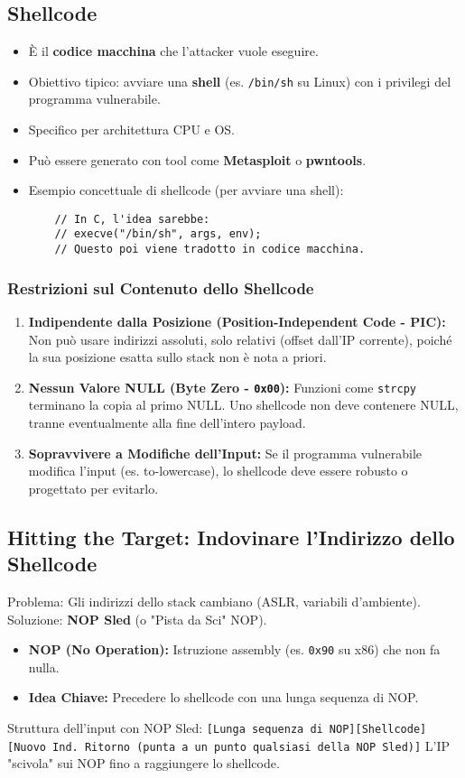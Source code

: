 \documentclass{article}
\begin{document}
\subsection{Shellcode}
\begin{itemize}
    \item È il \textbf{codice macchina} che l'attacker vuole eseguire.
    \item Obiettivo tipico: avviare una \textbf{shell} (es. \texttt{/bin/sh} su Linux) con i privilegi del programma vulnerabile.
    \item Specifico per architettura CPU e OS.
    \item Può essere generato con tool come \textbf{Metasploit} o \textbf{pwntools}.
    \item Esempio concettuale di shellcode (per avviare una shell):
    \begin{verbatim}
    // In C, l'idea sarebbe:
    // execve("/bin/sh", args, env);
    // Questo poi viene tradotto in codice macchina.
    \end{verbatim}
\end{itemize}

\subsubsection{Restrizioni sul Contenuto dello Shellcode}
\begin{enumerate}
    \item \textbf{Indipendente dalla Posizione (Position-Independent Code - PIC):}
    Non può usare indirizzi assoluti, solo relativi (offset dall'IP corrente), poiché la sua posizione esatta sullo stack non è nota a priori.
    \item \textbf{Nessun Valore NULL (Byte Zero - \texttt{0x00}):}
    Funzioni come \texttt{strcpy} terminano la copia al primo NULL. Uno shellcode non deve contenere NULL, tranne eventualmente alla fine dell'intero payload.
    \item \textbf{Sopravvivere a Modifiche dell'Input:}
    Se il programma vulnerabile modifica l'input (es. to-lowercase), lo shellcode deve essere robusto o progettato per evitarlo.
\end{enumerate}

\subsection{Hitting the Target: Indovinare l'Indirizzo dello Shellcode}
Problema: Gli indirizzi dello stack cambiano (ASLR, variabili d'ambiente).
Soluzione: \textbf{NOP Sled} (o "Pista da Sci" NOP).
\begin{itemize}
    \item \textbf{NOP (No Operation):} Istruzione assembly (es. \texttt{0x90} su x86) che non fa nulla.
    \item \textbf{Idea Chiave:} Precedere lo shellcode con una lunga sequenza di NOP.
\end{itemize}
Struttura dell'input con NOP Sled:
\texttt{[Lunga sequenza di NOP][Shellcode][Nuovo Ind. Ritorno (punta a un punto qualsiasi della NOP Sled)]}
L'IP "scivola" sui NOP fino a raggiungere lo shellcode.
\end{document}
